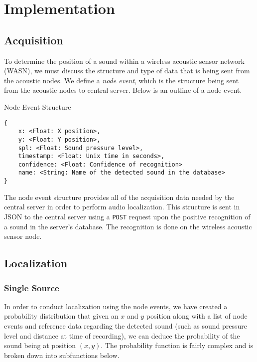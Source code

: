 \documentclass[12pt]{article}
\begin{document}
\maketitle

\section{Implementation}

\subsection{Acquisition}

To determine the position of a sound within a wireless acoustic sensor network
(WASN), we must discuss the structure and type of data that is being sent from
the acoustic nodes. We define a \emph{node event}, which is the structure being
sent from the acoustic nodes to central server. Below is an outline of a node
event.


\begin{program}
\caption{Node Event Structure}
\begin{verbatim}
{
    x: <Float: X position>,
    y: <Float: Y position>,
    spl: <Float: Sound pressure level>,
    timestamp: <Float: Unix time in seconds>,
    confidence: <Float: Confidence of recognition>
    name: <String: Name of the detected sound in the database>
}
\end{verbatim}
\end{program}

The node event structure provides all of the acquisition data needed by the
central server in order to perform audio localization. This structure is sent
in JSON to the central server using a \verb|POST| request upon the positive
recognition of a sound in the server's database. The recognition is done on the
wireless acoustic sensor node.

\subsection{Localization}

\subsubsection{Single Source}

In order to conduct localization using the node events, we have created a
probability distribution that given an $x$ and $y$ position along with a list
of node events and reference data regarding the detected sound (such as sound
pressure level and distance at time of recording), we can deduce the
probability of the sound being at position $(x, y)$. The probability function
is fairly complex and is broken down into subfunctions below.
\end{document}

